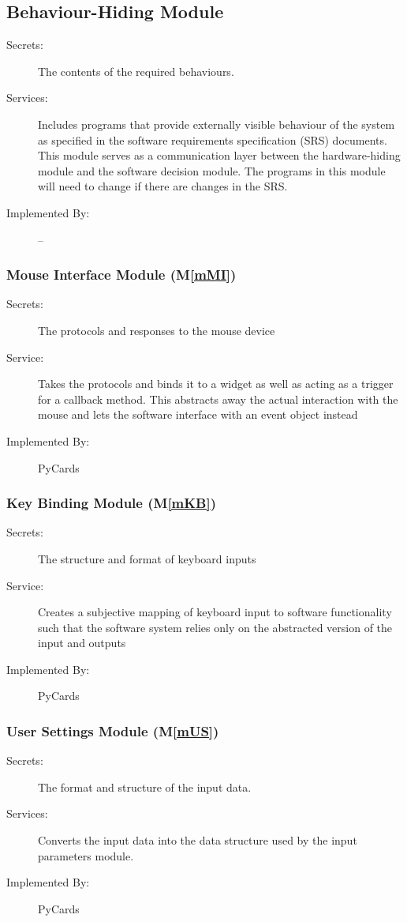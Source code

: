 \documentclass[12pt, titlepage]{article}
\newcommand{\mref}[1]{M\ref{#1}}
\begin{document}
	\subsection{Behaviour-Hiding Module}
	
	\begin{description}
		\item[Secrets:]The contents of the required behaviours.
		\item[Services:]Includes programs that provide externally visible 
		behaviour of the system as specified in the software requirements 
		specification (SRS) documents. This module serves as a communication 
		layer between the hardware-hiding module and the software decision 
		module. The programs in this module will need to change if there are 
		changes in the SRS.
		\item[Implemented By:] --
	\end{description}
	\subsubsection{Mouse Interface Module (\mref{mMI})}
	\begin{description}
		\item[Secrets:]The protocols and responses to the mouse device
		\item[Service:]Takes the protocols and binds it to a widget as well as 
		acting as a trigger for a callback method. This abstracts away the 
		actual interaction with the mouse and lets the software interface with 
		an event object instead
		\item[Implemented By:] PyCards
	\end{description}
	\subsubsection{Key Binding Module (\mref{mKB})}
	\begin{description}
		\item[Secrets:]The structure and format of keyboard inputs
		\item[Service:]Creates a subjective mapping of keyboard input to 
		software functionality such that the software system relies only on the 
		abstracted version of the input and outputs
		\item[Implemented By:] PyCards
	\end{description}
	\subsubsection{User Settings Module (\mref{mUS})}
	\begin{description}
		\item[Secrets:]The format and structure of the input data.
		\item[Services:]Converts the input data into the data structure used by 
		the input parameters module.
		\item[Implemented By:] PyCards
	\end{description}
\end{document}
